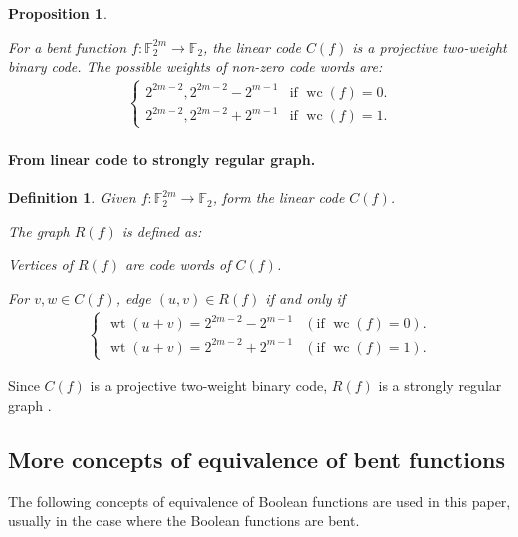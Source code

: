 \documentclass[12pt,a4paper]{article}
\newcommand{\mb}[1]{\mathbb{#1}}
\newcommand{\F}{\mb{F}}
\newcommand{\To}{\rightarrow}
\newcommand{\weight}[1]{\operatorname{wt}\left(#1\right)}
\newcommand{\weightclass}[1]{\operatorname{wc}\left(#1\right)}
\newtheorem{Proposition}{Proposition}
\newtheorem{Definition}{Definition}
\begin{document}
%
\begin{Proposition}
\cite[Corollary 10]{DinD15class}

For a bent function $f : \F_2^{2m} \To \F_2$, the linear code $C(f)$
is a projective two-weight binary code.
%
%
The possible weights of non-zero code words are:
\begin{align*}
\begin{cases}
2^{2m-2}, 2^{2m-2} - 2^{m-1} & \text{if~} \weightclass{f}=0.
\\
2^{2m-2}, 2^{2m-2} + 2^{m-1} & \text{if~} \weightclass{f}=1.
\end{cases}
\end{align*}
%
\end{Proposition}
%
%
\paragraph*{From linear code to strongly regular graph.}
\begin{Definition}
\label{R-f-def}
Given $f : \F_2^{2m} \To \F_2$, form the linear code $C(f)$.

The graph $R(f)$ is defined as:

Vertices of $R(f)$ are code words of $C(f)$.

For $v,w \in C(f)$, edge $(u,v) \in R(f)$ if and only if
\begin{align*}
\begin{cases}
\weight{u+v} = 2^{2m-2} - 2^{m-1} & (\text{if~}\weightclass{f}=0).
\\
\weight{u+v} = 2^{2m-2} + 2^{m-1} & (\text{if~}\weightclass{f}=1).
\end{cases}
\end{align*}

\end{Definition}
Since $C(f)$ is a projective two-weight binary code,
$R(f)$ is a strongly regular graph \cite[Theorem 2]{Del72weights}.


\subsection{More concepts of equivalence of bent functions}
The following concepts of equivalence of Boolean functions are used in this paper,
usually in the case where the Boolean functions are bent.
\end{document}
